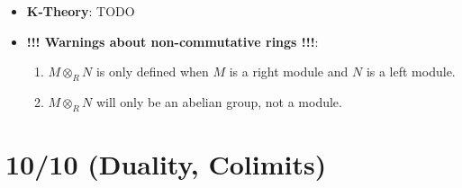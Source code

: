 \documentclass[11pt, oneside]{amsart}   	%
\theoremstyle{definition}
\begin{document}
\begin{itemize}
	 \item \textbf{K-Theory}: TODO
	 
	 \item \textbf{!!! Warnings about non-commutative rings !!!}: 
	 
	 	\begin{enumerate}
		
			\item $M\otimes_R N$ is only defined when $M$ is a right module and $N$ is a left module.
			
			\item $M\otimes_R N$ will only be an abelian group, not a module.
		
		\end{enumerate}
	
\end{itemize}

\section{10/10 (Duality, Colimits)}
\end{document}
